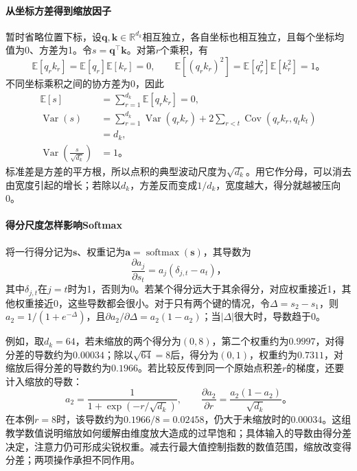 \paragraph{从坐标方差得到缩放因子}
暂时省略位置下标，设$\bm q,\bm k\in\mathbb R^{d_k}$相互独立，各自坐标也相互独立，且每个坐标均值为0、方差为1。令$s=\bm q^{\top}\bm k$。对第$r$个乘积，有
\[
  \mathbb E[q_rk_r]=\mathbb E[q_r]\mathbb E[k_r]=0,\qquad
  \mathbb E[(q_rk_r)^2]=\mathbb E[q_r^2]\mathbb E[k_r^2]=1\text{。}
\]
不同坐标乘积之间的协方差为0，因此
\begin{equation}
  \begin{aligned}
    \mathbb E[s]&=\sum_{r=1}^{d_k}\mathbb E[q_rk_r]=0,\\
    \operatorname{Var}(s)
      &=\sum_{r=1}^{d_k}\operatorname{Var}(q_rk_r)
        +2\sum_{r<t}\operatorname{Cov}(q_rk_r,q_tk_t)\\
      &=d_k,\\
    \operatorname{Var}\!\left(\frac{s}{\sqrt{d_k}}\right)&=1\text{。}
  \end{aligned}
  \label{eq:transformer-attention-scale-variance}
\end{equation}
标准差是方差的平方根，所以点积的典型波动尺度为$\sqrt{d_k}$。用它作分母，可以消去由宽度引起的增长；若除以$d_k$，方差反而变成$1/d_k$，宽度越大，得分就越被压向0。

\paragraph{得分尺度怎样影响Softmax}
将一行得分记为$\bm s$、权重记为$\bm a=\operatorname{softmax}(\bm s)$，其导数为
\begin{equation}
  \frac{\partial a_j}{\partial s_t}
      =a_j(\delta_{j,t}-a_t)\text{，}
  \label{eq:transformer-softmax-scale-gradient}
\end{equation}
其中$\delta_{j,t}$在$j=t$时为1，否则为0。若某个得分远大于其余得分，对应权重接近1，其他权重接近0，这些导数都会很小。对于只有两个键的情况，令$\Delta=s_2-s_1$，则$a_2=1/(1+e^{-\Delta})$，且$\partial a_2/\partial\Delta=a_2(1-a_2)$；当$|\Delta|$很大时，导数趋于0。

例如，取$d_k=64$，若未缩放的两个得分为$(0,8)$，第二个权重约为$0.9997$，对得分差的导数约为$0.00034$；除以$\sqrt{64}=8$后，得分为$(0,1)$，权重约为$0.7311$，对缩放后得分差的导数约为$0.1966$。若比较反传到同一个原始点积差$r$的梯度，还要计入缩放的导数：
\[
  a_2=\frac{1}{1+\exp(-r/\sqrt{d_k})},\qquad
  \frac{\partial a_2}{\partial r}
    =\frac{a_2(1-a_2)}{\sqrt{d_k}}\text{。}
\]
在本例$r=8$时，该导数约为$0.1966/8=0.02458$，仍大于未缩放时的$0.00034$。这组教学数值说明缩放如何缓解由维度放大造成的过早饱和；具体输入的导数由得分差决定，注意力仍可形成尖锐权重。减去行最大值控制指数的数值范围，缩放改变得分差；两项操作承担不同作用。

